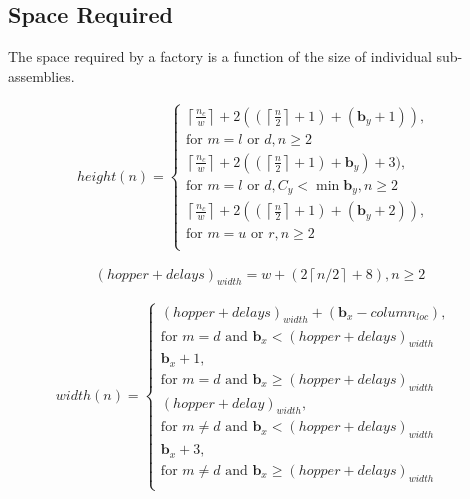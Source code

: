 \subsection{Space Required}\label{sec:requiredSpace}
The space required by a factory is a function of the size of individual sub-assemblies.

\begin{align}
height(n)=
\begin{cases}
\left \lceil{   \frac{n_c}{w}}\right \rceil+2((\left \lceil{\frac{n}{2}}\right \rceil+1)+(\mathbf{b}_y+1)),&\\ 
\text{for } m = l \text{ or } d, n \geq 2&\\
\left \lceil{   \frac{n_c}{w}}\right \rceil+2((\left \lceil{\frac{n}{2}}\right \rceil+1)+\mathbf{b}_y)+3),&\\ 
\text{for } m = l \text{ or } d, C_y  < \min \mathbf{b}_y, n \geq 2&\\
\left \lceil{\frac{n_c}{w}}\right \rceil+2((\left \lceil{\frac{n}{2}}\right \rceil+1)+(\mathbf{b}_y+2)),&\\ 
\text{for } m = u \text{ or } r, n\geq 2&\\
\end{cases}
\end{align}



\begin{equation}
(hopper+delays)_{width}=w+(2\left \lceil{n/2}\right \rceil+8),  n \geq 2
\end{equation}

\begin{align}
width(n)=
\begin{cases}
(hopper+delays)_{width}+(\mathbf{b}_x-column_{loc}),&\\ 
\text{for } m = d \text{ and } \mathbf{b}_x < (hopper+delays)_{width}&\\
\mathbf{b}_x + 1,&\\ 
\text{for } m = d \text{ and } \mathbf{b}_x \geq (hopper+delays)_{width}&\\
(hopper+delay)_{width},&\\ 
\text{for } m \neq d  \text{ and } \mathbf{b}_x < (hopper+delays)_{width}&\\
\mathbf{b}_x + 3,&\\ 
\text{for } m \neq d \text{ and } \mathbf{b}_x \geq (hopper+delays)_{width}&\\
\end{cases}
\end{align}


